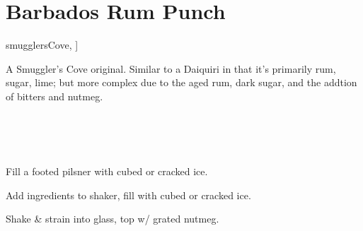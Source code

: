 \section[Barbados Rum Punch]{Barbados Rum Punch~}


\begin{recipestats}[
	servings=1,
	preptime=5~\minute,
	original=\citeauthor{smugglersCove}~\cite[p.~179]{smugglersCove},
]
\end{recipestats}

\begin{recipeabstract}
	A Smuggler's Cove original.
	Similar to a Daiquiri in that it's primarily rum, sugar, lime; but more complex due to the aged rum, dark sugar, and the addtion of bitters and nutmeg.
\end{recipeabstract}


\begin{ingredientcolumns}[1]
	\begin{ingredientblock}
		\\
		\\
		\\
	\end{ingredientblock}
\end{ingredientcolumns}


\begin{preparation}
	\item Fill a footed pilsner with cubed or cracked ice.
	\item Add ingredients to shaker, fill with cubed or cracked ice.
	\item Shake \& strain into glass, top w/ grated nutmeg.
\end{preparation}


\recipeend%
